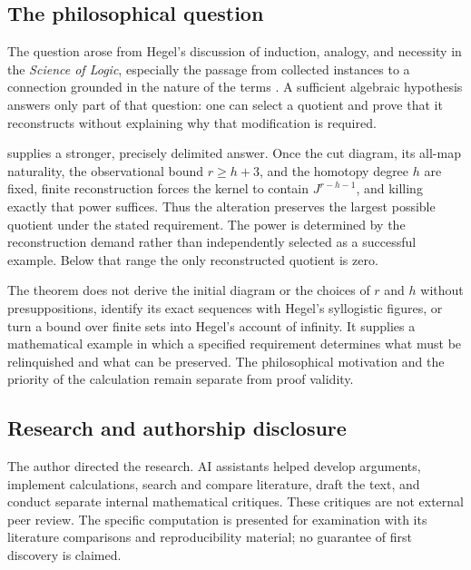 \documentclass[11pt,a4paper]{article}
\theoremstyle{definition}
\theoremstyle{remark}
\begin{document}
\subsection{The philosophical question}

The question arose from Hegel's discussion of induction, analogy, and necessity in the \emph{Science of Logic}, especially the passage from collected instances to a connection grounded in the nature of the terms \cite{Hegel}. A sufficient algebraic hypothesis answers only part of that question: one can select a quotient and prove that it reconstructs without explaining why that modification is required.

 supplies a stronger, precisely delimited answer.
Once the cut diagram, its all-map naturality, the observational bound
$r\ge h+3$, and the homotopy degree $h$ are fixed, finite reconstruction
forces the kernel to contain $J^{r-h-1}$, and killing exactly that
power suffices. Thus the alteration preserves the largest possible
quotient under the stated requirement. The power is determined by
the reconstruction demand rather than independently selected as a
successful example.
Below that range the only reconstructed quotient is zero.

The theorem does not derive the initial diagram or the choices of
$r$ and $h$ without presuppositions, identify its exact sequences with
Hegel's syllogistic figures, or turn a bound over finite sets into
Hegel's account of infinity. It supplies a mathematical example in
which a specified requirement determines what must be relinquished
and what can be preserved. The philosophical motivation and the
priority of the calculation remain separate from proof validity.

\subsection*{Research and authorship disclosure}
The author directed the research. AI assistants helped develop arguments, implement calculations, search and compare literature, draft the text, and conduct separate internal mathematical critiques. These critiques are not external peer review. The specific computation is presented for examination with its literature comparisons and reproducibility material; no guarantee of first discovery is claimed.
\end{document}
